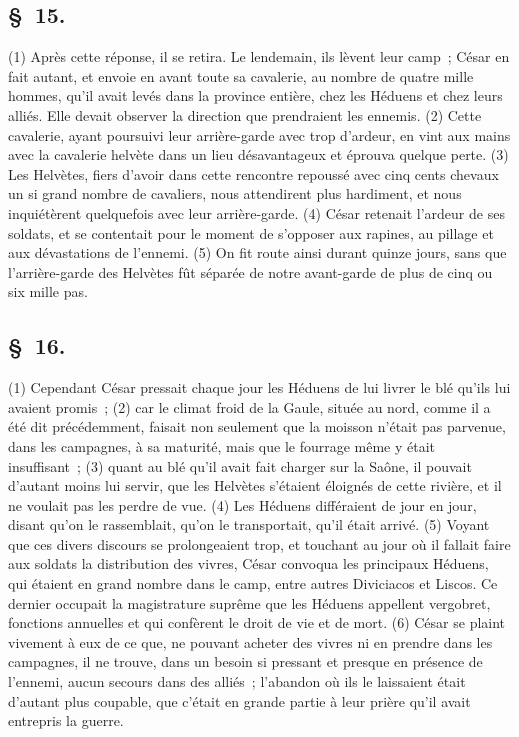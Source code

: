 \documentclass[french,twoside]{book} %
\begin{document}
\subsection[{§ 15.}]{ \textsc{§ 15.} }
\noindent (1) Après cette réponse, il se retira. Le lendemain, ils lèvent leur camp ; César en fait autant, et envoie en avant toute sa cavalerie, au nombre de quatre mille hommes, qu’il avait levés dans la province entière, chez les Héduens et chez leurs alliés. Elle devait observer la direction que prendraient les ennemis. (2) Cette cavalerie, ayant poursuivi leur arrière-garde avec trop d’ardeur, en vint aux mains avec la cavalerie helvète dans un lieu désavantageux et éprouva quelque perte. (3) Les Helvètes, fiers d’avoir dans cette rencontre repoussé avec cinq cents chevaux un si grand nombre de cavaliers, nous attendirent plus hardiment, et nous inquiétèrent quelquefois avec leur arrière-garde. (4) César retenait l’ardeur de ses soldats, et se contentait pour le moment de s’opposer aux rapines, au pillage et aux dévastations de l’ennemi. (5) On fit route ainsi durant quinze jours, sans que l’arrière-garde des Helvètes fût séparée de notre avant-garde de plus de cinq ou six mille pas.
\subsection[{§ 16.}]{ \textsc{§ 16.} }
\noindent (1) Cependant César pressait chaque jour les Héduens de lui livrer le blé qu’ils lui avaient promis ; (2) car le climat froid de la Gaule, située au nord, comme il a été dit précédemment, faisait non seulement que la moisson n’était pas parvenue, dans les campagnes, à sa maturité, mais que le fourrage même y était insuffisant ; (3) quant au blé qu’il avait fait charger sur la Saône, il pouvait d’autant moins lui servir, que les Helvètes s’étaient éloignés de cette rivière, et il ne voulait pas les perdre de vue. (4) Les Héduens différaient de jour en jour, disant qu’on le rassemblait, qu’on le transportait, qu’il était arrivé. (5) Voyant que ces divers discours se prolongeaient trop, et touchant au jour où il fallait faire aux soldats la distribution des vivres, César convoqua les principaux Héduens, qui étaient en grand nombre dans le camp, entre autres Diviciacos et Liscos. Ce dernier occupait la magistrature suprême que les Héduens appellent vergobret, fonctions annuelles et qui confèrent le droit de vie et de mort. (6) César se plaint vivement à eux de ce que, ne pouvant acheter des vivres ni en prendre dans les campagnes, il ne trouve, dans un besoin si pressant et presque en présence de l’ennemi, aucun secours dans des alliés ; l’abandon où ils le laissaient était d’autant plus coupable, que c’était en grande partie à leur prière qu’il avait entrepris la guerre.
\end{document}

